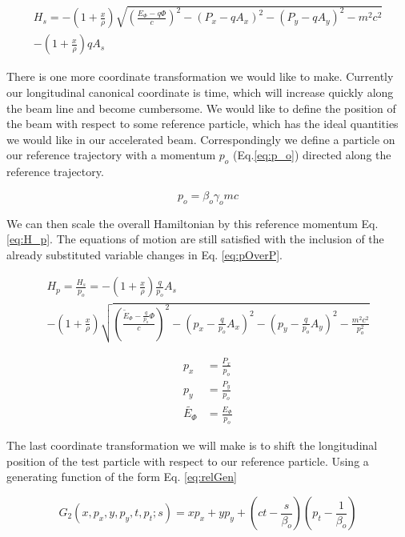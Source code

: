 \begin{multline} \label{eq:H_s}
	H_s = -\left(1 + \frac{x}{\rho}\right)\sqrt{\left(\frac{E_{\Phi} - q\Phi}{c}\right)^2 - (P_x -q A_x)^2 - (P_y - q A_y)^2 - m^2c^2}\\ - \left(1 + \frac{x}{\rho}\right)qA_s
\end{multline}

There is one more coordinate transformation we would like to make. Currently our longitudinal canonical coordinate is time, which will increase quickly along the beam line and become cumbersome. We would like to define the position of the beam with respect to some reference particle, which has the ideal quantities we would like in our accelerated beam. Correspondingly we define a particle on our reference trajectory with a momentum $p_o$ (Eq.\ref{eq:p_o}) directed along the reference trajectory.

\begin{equation} \label{eq:p_o}
	p_o = \beta_o \gamma_o m c
\end{equation}

We can then scale the overall Hamiltonian by this reference momentum Eq. \ref{eq:H_p}. The equations of motion are still satisfied with the inclusion of the already substituted variable changes in Eq. \ref{eq:pOverP}.

\begin{multline} \label{eq:H_p}
	H_p = \frac{H_s}{p_o} = - \left(1 + \frac{x}{\rho}\right)\frac{q}{p_o}A_s\\
-\left(1 + \frac{x}{\rho}\right)\sqrt{\left(\frac{\tilde{E}_{\Phi} - \frac{q}{p_o}\Phi}{c}\right)^2 - \left(p_x -\frac{q}{p_o} A_x\right)^2 - \left(p_y - \frac{q}{p_o} A_y\right)^2 - \frac{m^2c^2}{p_o^2}}
\end{multline}


\begin{equation} \label{eq:pOverP}
\begin{split}
	p_x &= \frac{P_x}{p_o}\\
	p_y &= \frac{P_y}{p_o}\\
	\tilde{E_{\Phi}} &= \frac{E_{\Phi}}{p_o}
\end{split}
\end{equation}

The last coordinate transformation we will make is to shift the longitudinal position of the test particle with respect to our reference particle. Using a generating function of the form Eq. \ref{eq:relGen}


\begin{equation} \label{eq:relGen}
	G_2(x,p_x,y,p_y,t,p_t;s) = x p_x  + y p_y + \left(ct - \frac{s}{\beta_o}\right)\left(p_t - \frac{1}{\beta_o}\right)
\end{equation}


